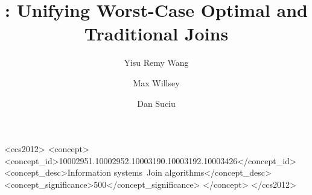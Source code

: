 \documentclass[sigconf,screen,nonacm]{acmart}
\author{Yisu Remy Wang}
\affiliation{
  \institution{University of Washington}
  \country{USA}
}
\author{Max Willsey}
\affiliation{
  \institution{University of Washington}
  \country{USA}
}
\author{Dan Suciu}
\affiliation{
  \institution{University of Washington}
  \country{USA}
}
\begin{document}
\title{\FJ: Unifying Worst-Case Optimal and Traditional Joins}

\begin{abstract}
  
\end{abstract}

\begin{CCSXML}
  <ccs2012>
  <concept>
  <concept_id>10002951.10002952.10003190.10003192.10003426</concept_id>
  <concept_desc>Information systems~Join algorithms</concept_desc>
  <concept_significance>500</concept_significance>
  </concept>
  </ccs2012>
\end{CCSXML}
  

\maketitle







% 
% 



\balance





% 
\end{document}
